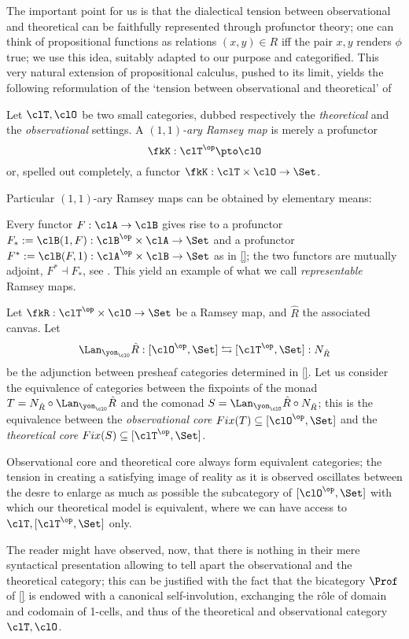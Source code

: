 \documentclass[a4paper]{../birkjour}
\begin{document}
The important point for us is that the dialectical tension between observational and theoretical can be faithfully represented through profunctor theory; one can think of propositional functions as relations $(x,y)\in R$ iff the pair $x,y$ renders $\phi$ true; we use this idea, suitably adapted to our purpose and categorified. This very natural extension of propositional calculus, pushed to its limit, yields the following reformulation of the `tension between observational and theoretical' of \cite{u,v,w}
\begin{definition}
  Let $\clT,\clO$ be two small categories, dubbed respectively the \emph{theoretical} and the \emph{observational} settings. A \emph{$(1,1)$-ary Ramsey map} is merely a profunctor 
  \[\fkK : \clT^\op \pto \clO\]
  or, spelled out completely, a functor $\fkK : \clT\times \clO \to \Set$.
\end{definition}
Particular $(1,1)$-ary Ramsey maps can be obtained by elementary means:
\begin{example}
 Every functor $F : \clA \to \clB$ gives rise to a profunctor $F_* := \clB(1,F) : \clB^\op\times \clA\to\Set$ and a profunctor $F^* := \clB(F,1) : \clA^\op\times\clB \to \Set$ as in \autoref{}; the two functors are mutually adjoint, $F^*\dashv F_*$, see \cite{}. This yield an example of what we call \emph{representable} Ramsey maps. 
\end{example}
\begin{definition}
  Let $\fkR : \clT^\op\times \clO \to\Set$ be a Ramsey map, and $\hat R$ the associated canvas. Let 
  \[ \Lan_{\yon_\clO}\hat R : [\clO^\op,\Set] \leftrightarrows [\clT^\op,\Set] : N_{\hat R} \]
  be the adjunction between presheaf categories determined in \autoref{}. Let us consider the equivalence of categories between the fixpoints of the monad $T = N_{\hat R}\circ\Lan_{\yon_\clO}\hat R$ and the comonad $S=\Lan_{\yon_\clO}\hat R\circ N_{\hat R}$; this is the equivalence between the \emph{observational core} $Fix(T)\subseteq [\clO^\op,\Set]$ and the \emph{theoretical core} $Fix(S)\subseteq [\clT^\op,\Set]$.
\end{definition}
\begin{remark}
Observational core and theoretical core always form equivalent categories; the tension in creating a satisfying image of reality as it is observed oscillates between the desre to enlarge as much as possible the subcategory of $[\clO^\op,\Set]$ with which our theoretical model is equivalent, where we can have access to $\clT, [\clT^\op, \Set]$ only.
\end{remark}
The reader might have observed, now, that there is nothing in their mere syntactical presentation allowing to tell apart the observational and the theoretical category; this can be justified with the fact that the bicategory $\Prof$ of \autoref{} is endowed with a canonical self-involution, exchanging the r\^ole of domain and codomain of 1-cells, and thus of the theoretical and observational category $\clT,\clO$. 
\end{document}
